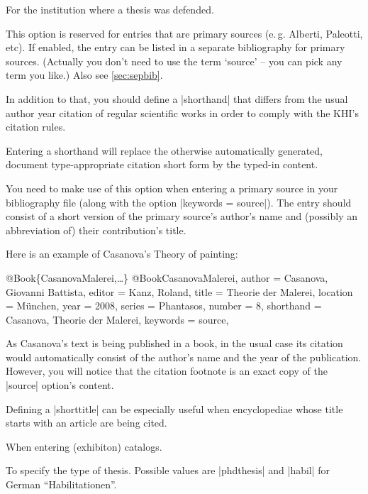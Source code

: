 \documentclass[a4paper,
10pt,
ngerman,
english
]{ltxdoc}
\begin{document}
For the institution where a thesis was defended.

\label{sec:source}
This option is reserved for entries that are primary sources (e.\,g. Alberti, Paleotti, etc). %
If enabled, the entry can be listed in a separate bibliography for primary sources. (Actually you don't need to use the term \enquote*{source} -- you can pick any term you like.) Also see \cref{sec:sepbib}.

In addition to that, you should define a |shorthand| that differs from the usual author year citation of regular scientific works in order to comply with the KHI's citation rules.

\label{sec:shorthand}
Entering a shorthand will replace the otherwise automatically generated, document type-appropriate citation short form by the typed-in content.

You need to make use of this option when entering a primary source in your bibliography file (along with the option |keywords = source|). The entry should consist of a short version of the primary source's author's name and (possibly an abbreviation of) their contribution's title.

Here is an example of Casanova's Theory of painting:
\begin{bibexample}[label=CasanovaMalerei]{{@}Book\{CasanovaMalerei,…\}}
@Book{CasanovaMalerei,
  author    = {Casanova, Giovanni Battista},
  editor    = {Kanz, Roland},
  title     = {Theorie der Malerei},
  location  = {München},
  year      = {2008},
  series    = {Phantasos},
  number    = {8},
  shorthand = {Casanova, Theorie der Malerei},
  keywords  = {source},
}
\end{bibexample}
As Casanova's text is being published in a book, in the usual case its citation would automatically consist of the author's name and the year of the publication.
However, you will notice that the citation footnote is an exact copy of the |source| option's content.

Defining a |shorttitle| can be especially useful when encyclopediae whose title starts with an article are being cited.

When entering (exhibiton) catalogs.

To specify the type of thesis. Possible values are |phdthesis| and |habil| for German \foreignquote{german}{Habilitationen}.
\end{document}
